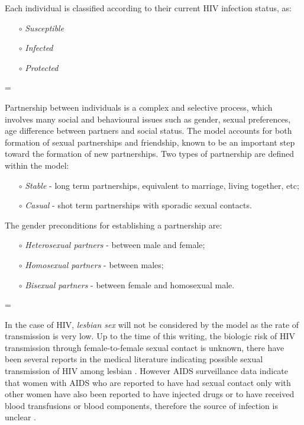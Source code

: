 Each individual is classified according to their current HIV infection status, as:
\parskip=0pt
\begin{itemize}
    \item [$\circ$] \emph{Susceptible}
    \item [$\circ$] \emph{Infected}
    \item [$\circ$] \emph{Protected}
\end{itemize}
\parskip=\baselineskip

Partnership between individuals is a complex and selective process, which involves many
social and behavioural issues such as gender, sexual preferences, age difference between
partners and social status. The model accounts for both formation of sexual partnerships
and friendship, known to be an important step toward the formation of new partnerships.
Two types of partnership are defined within the model:
\parskip=0pt
\begin{itemize}
    \item [$\circ$] \emph{Stable} - long term partnerships, equivalent to marriage, living together, etc;
    \item [$\circ$] \emph{Casual} - shot term partnerships with sporadic sexual contacts.
\end{itemize}
The gender preconditions for establishing a partnership are:
\begin{itemize}
    \item [$\circ$]\emph{Heterosexual partners} - between male and female;
    \item [$\circ$]\emph{Homosexual partners} - between males;
    \item [$\circ$]\emph{Bisexual partners} - between female and homosexual male.
\end{itemize}
\parskip=\baselineskip

In the case of HIV, \emph{lesbian sex} will not be considered by the model as the rate of
transmission is very low. Up to the time of this writing, the biologic risk of HIV
transmission through female-to-female sexual contact is unknown, there have been several
reports in the medical literature indicating possible sexual transmission of HIV among
lesbian \cite{Perry1989, Einhorn1994}. However AIDS surveillance data indicate that women
with AIDS who are reported to have had sexual contact only with other women have also
been reported to have injected drugs or to have received blood transfusions or blood
components, therefore the source of infection is unclear \cite{Raiteri1994}.

